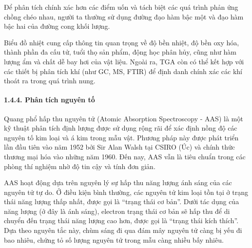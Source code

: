 \documentclass{article} %
\begin{document}
Để phân tích chính xác hơn các điểm uốn và tách biệt các quá trình phản ứng chồng chéo nhau, người ta thường sử dụng đường đạo hàm bậc một và đạo hàm bậc hai của đường cong khối lượng.

Biểu đồ nhiệt cung cấp thông tin quan trọng về độ bền nhiệt, độ bền oxy hóa, thành phần đa cấu tử, tuổi thọ sản phẩm, động học phân hủy, cũng như hàm lượng ẩm và chất dễ bay hơi của vật liệu. Ngoài ra, TGA còn có thể kết hợp với các thiết bị phân tích khí (như GC, MS, FTIR) để định danh chính xác các khí thoát ra trong quá trình nung.

\paragraph*{1.4.4. Phân tích nguyên tố}
\leavevmode

Quang phổ hấp thu nguyên tử (Atomic Absorption Spectroscopy - AAS) là một kỹ thuật phân tích định lượng được sử dụng rộng rãi để xác định nồng độ các nguyên tố kim loại và á kim trong mẫu vật. Phương pháp này được phát triển lần đầu tiên vào năm 1952 bởi Sir Alan Walsh tại CSIRO (Úc) và chính thức thương mại hóa vào những năm 1960. Đến nay, AAS vẫn là tiêu chuẩn trong các phòng thí nghiệm nhờ độ tin cậy và tính đơn giản.

AAS hoạt động dựa trên nguyên lý sự hấp thu năng lượng ánh sáng của các nguyên tử tự do. Ở điều kiện bình thường, các nguyên tử kim loại tồn tại ở trạng thái năng lượng thấp nhất, được gọi là ``trạng thái cơ bản''. Dưới tác dụng của năng lượng (ở đây là ánh sáng), electron trạng thái cơ bản sẽ hấp thu để di chuyển đến trạng thái năng lượng cao hơn, được gọi là ``trạng thái kích thích''. Dựa theo nguyên tắc này, chùm sáng đi qua đám mây nguyên tử càng bị yếu đi bao nhiêu, chứng tỏ số lượng nguyên tử trong mẫu càng nhiều bấy nhiêu.
\end{document}
